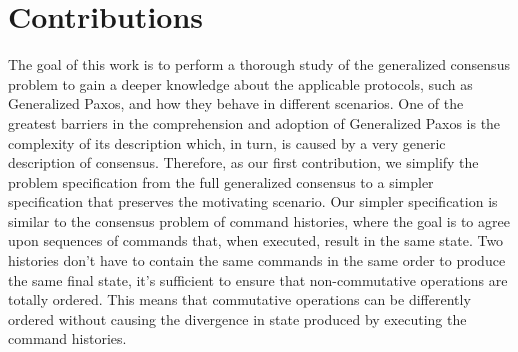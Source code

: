 \section{Contributions}
The goal of this work is to perform a thorough study of the generalized consensus problem to gain a deeper knowledge about the applicable protocols, such as Generalized Paxos, and how they behave in different scenarios. One of the greatest barriers in the comprehension and adoption of Generalized Paxos is the complexity of its description which, in turn, is caused by a very generic description of consensus. Therefore, as our first contribution, we simplify the problem specification from the full generalized consensus to a simpler specification that preserves the motivating scenario. Our simpler specification is similar to the consensus problem of command histories, where the goal is to agree upon sequences of commands that, when executed, result in the same state. Two histories don't have to contain the same commands in the same order to produce the same final state, it's sufficient to ensure that non-commutative operations are totally ordered. This means that commutative operations can be differently ordered without causing the divergence in state produced by executing the command histories. \par
